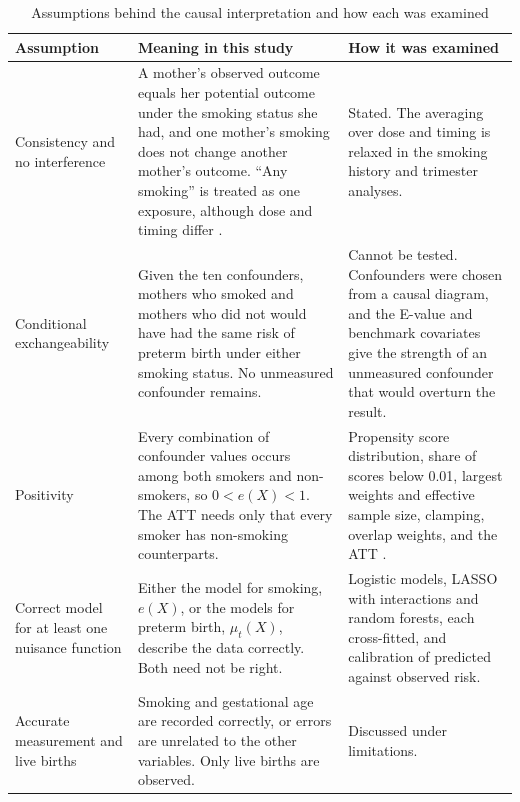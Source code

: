 \documentclass[11pt,letterpaper]{article}
\begin{document}
\begin{table}[htbp]
\centering
\caption{Assumptions behind the causal interpretation and how each was examined}\label{tab:assump}
\small
\begin{tabular}{>{\raggedright\arraybackslash}p{3.0cm}>{\raggedright\arraybackslash}p{6.4cm}>{\raggedright\arraybackslash}p{5.6cm}}
\toprule
Assumption & Meaning in this study & How it was examined \\
\midrule
Consistency and no interference & A mother's observed outcome equals her potential outcome under the smoking status she had, and one mother's smoking does not change another mother's outcome. \textquotedblleft Any smoking\textquotedblright{} is treated as one exposure, although dose and timing differ \cite{cole2009}. & Stated. The averaging over dose and timing is relaxed in the smoking history and trimester analyses. \\[4pt]
Conditional exchangeability & Given the ten confounders, mothers who smoked and mothers who did not would have had the same risk of preterm birth under either smoking status. No unmeasured confounder remains. & Cannot be tested. Confounders were chosen from a causal diagram, and the E-value and benchmark covariates give the strength of an unmeasured confounder that would overturn the result. \\[4pt]
Positivity & Every combination of confounder values occurs among both smokers and non-smokers, so $0<e(X)<1$. The ATT needs only that every smoker has non-smoking counterparts. & Propensity score distribution, share of scores below 0.01, largest weights and effective sample size, clamping, overlap weights, and the ATT \cite{petersen2012}. \\[4pt]
Correct model for at least one nuisance function & Either the model for smoking, $e(X)$, or the models for preterm birth, $\mu_t(X)$, describe the data correctly. Both need not be right. & Logistic models, LASSO with interactions and random forests, each cross-fitted, and calibration of predicted against observed risk. \\[4pt]
Accurate measurement and live births & Smoking and gestational age are recorded correctly, or errors are unrelated to the other variables. Only live births are observed. & Discussed under limitations. \\
\bottomrule
\end{tabular}
\end{table}
\end{document}
